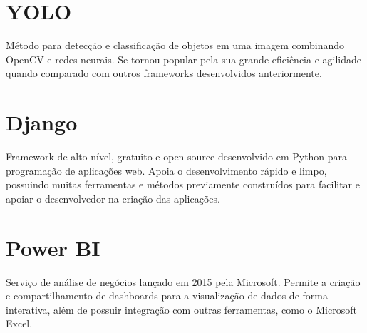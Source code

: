 \section{YOLO}
\indent
\par Método para detecção e classificação de objetos em uma imagem combinando OpenCV e redes neurais. Se tornou popular pela sua grande eficiência e agilidade quando comparado com outros frameworks desenvolvidos anteriormente.

\section{Django}
\indent
\par Framework de alto nível, gratuito e open source desenvolvido em Python para programação de aplicações web. Apoia o desenvolvimento rápido e limpo, possuindo muitas ferramentas e métodos previamente construídos para facilitar e apoiar o desenvolvedor na criação das aplicações.

\section{Power BI}
\indent
\par Serviço de análise de negócios lançado em 2015 pela Microsoft. Permite a criação e compartilhamento de dashboards para a visualização de dados de forma interativa, além de possuir integração com outras ferramentas, como o Microsoft Excel.


